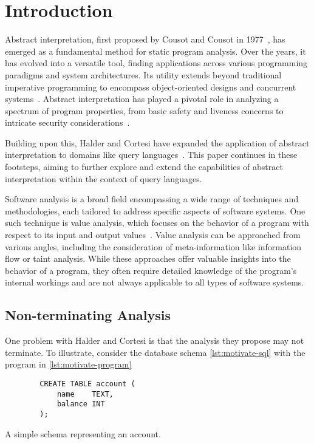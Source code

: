\section{Introduction}\label{sec:introduction}
Abstract interpretation, first proposed by Cousot and Cousot in 1977~\cite{cousot_abstract_1977}, has emerged as a fundamental method for static program analysis.
Over the years, it has evolved into a versatile tool, finding applications across various programming paradigms and system architectures.
Its utility extends beyond traditional imperative programming to encompass object-oriented designs and concurrent systems~\cite{gustafsson_analyzing_2013, mine_static_2023}.
Abstract interpretation has played a pivotal role in analyzing a spectrum of program properties, from basic safety and liveness concerns to intricate security considerations~\cite{mastroeni_abstract_2011}.

Building upon this, Halder and Cortesi have expanded the application of abstract interpretation to domains like query languages~\cite{halder_abstract_2012}.
This paper continues in these footsteps, aiming to further explore and extend the capabilities of abstract interpretation within the context of query languages.

Software analysis is a broad field encompassing a wide range of techniques and methodologies, each tailored to address specific aspects of software systems.
One such technique is value analysis, which focuses on the behavior of a program with respect to its input and output values~\cite{jackson_software_2000}.
Value analysis can be approached from various angles, including the consideration of meta-information like information flow or taint analysis.
While these approaches offer valuable insights into the behavior of a program, they often require detailed knowledge of the program's internal workings and are not always applicable to all types of software systems.


\subsection{Non-terminating Analysis}\label{subsec:non-terminating-analysis}
One problem with Halder and Cortesi is that the analysis they propose may not terminate.
To illustrate, consider the database schema \autoref{lst:motivate-sql} with the program in \autoref{lst:motivate-program}


\begin{listing}
    \begin{verbatim}
        CREATE TABLE account (
            name    TEXT,
            balance INT
        );
    \end{verbatim}
    \caption{A simple schema representing an account.}
    \label{lst:motivate-sql}
\end{listing}


